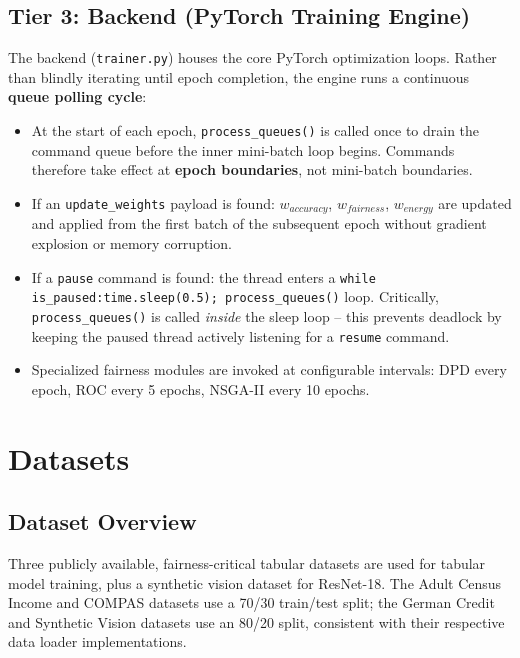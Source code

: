\documentclass[12pt,a4paper]{article}
\begin{document}
\subsection{Tier 3: Backend (PyTorch Training Engine)}

The backend (\texttt{trainer.py}) houses the core PyTorch optimization loops. Rather than blindly iterating until epoch completion, the engine runs a continuous \textbf{queue polling cycle}:

\begin{itemize}
    \item At the start of each epoch, \texttt{process\_queues()} is called once to drain the command queue before the inner mini-batch loop begins. Commands therefore take effect at \textbf{epoch boundaries}, not mini-batch boundaries.
    \item If an \texttt{update\_weights} payload is found: $w_{accuracy}$, $w_{fairness}$, $w_{energy}$ are updated and applied from the first batch of the subsequent epoch without gradient explosion or memory corruption.
    \item If a \texttt{pause} command is found: the thread enters a \texttt{while is\_paused:time.sleep(0.5); process\_queues()} loop. Critically, \texttt{process\_queues()} is called \textit{inside} the sleep loop -- this prevents deadlock by keeping the paused thread actively listening for a \texttt{resume} command.
    \item Specialized fairness modules are invoked at configurable intervals: DPD every epoch, ROC every 5 epochs, NSGA-II every 10 epochs.
\end{itemize}

\section{Datasets}

\subsection{Dataset Overview}

Three publicly available, fairness-critical tabular datasets are used for tabular model training, plus a synthetic vision dataset for ResNet-18. The Adult Census Income and COMPAS datasets use a 70/30 train/test split; the German Credit and Synthetic Vision datasets use an 80/20 split, consistent with their respective data loader implementations.
\end{document}
